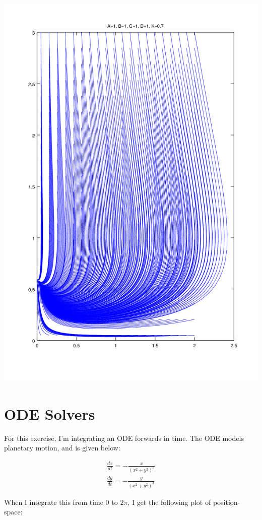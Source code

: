 \documentclass{article}
\begin{document}
\includegraphics[width=\textwidth]{plots/phase-potrait-past-degenerate.png}

\section{ODE Solvers}

For this exercise, I'm integrating an ODE forwards in time.
The ODE models planetary motion, and is given below:

\begin{align}
	\frac{dx}{dt} = - \frac{x}{ \left( x^2 + y^2 \right)^3 }\\
	\frac{dy}{dt} = - \frac{y}{ \left( x^2 + y^2 \right)^3 }
\end{align}

When I integrate this from time $0$ to $2 \pi$, I get the following plot
	of position-space:
\end{document}
